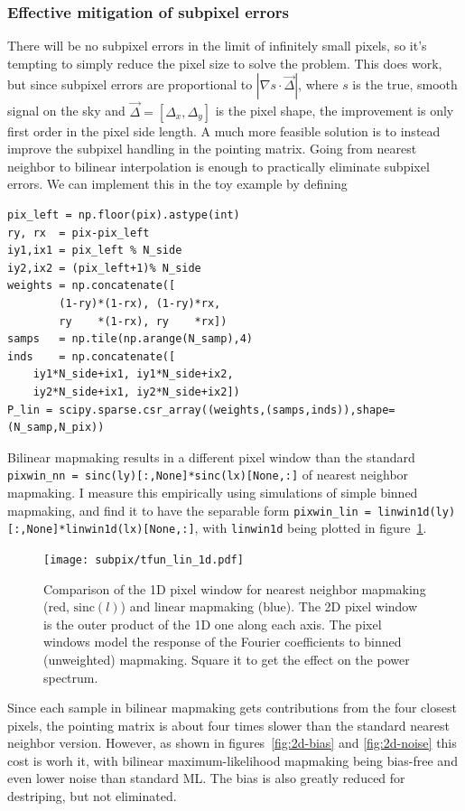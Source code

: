 \documentclass[twocolumn,apj]{aastex63}
\begin{document}
\subsubsection{Effective mitigation of subpixel errors}
There will be no subpixel errors in the limit of infinitely small pixels,
so it's tempting to simply reduce the pixel size to solve the problem. This
does work, but since subpixel errors are proportional to $|\nabla s \cdot \vec \Delta|$,
where $s$ is the true, smooth signal on the sky and $\vec \Delta = [\Delta_x,\Delta_y]$
is the pixel shape, the improvement is only first order in the pixel side length.
A much more feasible solution is to instead improve the subpixel handling in the
pointing matrix. Going from nearest neighbor to bilinear interpolation is enough
to practically eliminate subpixel errors. We can implement this in the toy example
by defining
\begin{lstlisting}
pix_left = np.floor(pix).astype(int)
ry, rx  = pix-pix_left
iy1,ix1 = pix_left % N_side
iy2,ix2 = (pix_left+1)% N_side
weights = np.concatenate([
		(1-ry)*(1-rx), (1-ry)*rx,
		ry    *(1-rx), ry    *rx])
samps   = np.tile(np.arange(N_samp),4)
inds    = np.concatenate([
	iy1*N_side+ix1, iy1*N_side+ix2,
	iy2*N_side+ix1, iy2*N_side+ix2])
P_lin = scipy.sparse.csr_array((weights,(samps,inds)),shape=(N_samp,N_pix))
\end{lstlisting}
Bilinear mapmaking results in a different pixel window than
the standard \lstinline{pixwin_nn = sinc(ly)[:,None]*sinc(lx)[None,:]}
of nearest neighbor mapmaking. I measure this empirically using simulations
of simple binned mapmaking, and find it to have the separable form
\lstinline{pixwin_lin = linwin1d(ly)[:,None]*linwin1d(lx)[None,:]},
with \lstinline{linwin1d} being plotted in figure~\ref{fig:linwin1d}.

\begin{figure}
	\centering
	\texttt{[image: subpix/tfun\_lin\_1d.pdf]}
	\caption{Comparison of the 1D pixel window for nearest neighbor
	mapmaking (red, $\text{sinc}(l)$) and linear mapmaking (blue). The 2D pixel window
	is the outer product of the 1D one along each axis. The pixel
	windows model the response of the Fourier coefficients to
	binned (unweighted) mapmaking. Square it to get the effect on
	the power spectrum.}
	\label{fig:linwin1d}
\end{figure}

Since each sample in bilinear mapmaking gets contributions from the four closest pixels,
the pointing matrix is about four times slower than the standard nearest neighbor
version. However, as shown in figures~\ref{fig:2d-bias} and \ref{fig:2d-noise}
this cost is worh it, with bilinear maximum-likelihood mapmaking being bias-free
and even lower noise than standard ML. The bias is also greatly reduced for
destriping, but not eliminated.
\end{document}
